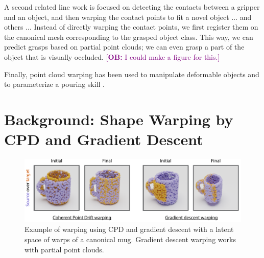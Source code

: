 \documentclass{article}
\newcommand{\ob}[1]{\textcolor{purple}{[\textbf{OB:} #1]}}
\begin{document}
A second related line work is focused on detecting the contacts between a gripper and an object, and then warping the contact points to fit a novel object \cite{li07datadriven,benamor12generalization,hillenbrand12transferring,jakel12learning,stouraitis15functional,rodriguez18learning,pavlichenko19autonomous,tian19transferring} ... and others ... Instead of directly warping the contact points, we first register them on the canonical mesh corresponding to the grasped object class. This way, we can predict grasps based on partial point clouds; we can even grasp a part of the object that is visually occluded. \ob{I could make a figure for this.}

Finally, point cloud warping has been used to manipulate deformable objects \cite{lee15learning,schulman16learning} and to parameterize a pouring skill \cite{brandi14generalizing}.



\section{Background: Shape Warping by CPD and Gradient Descent}
\label{sec:background}

\begin{figure}
    \centering
    \includegraphics[width=\textwidth]{figures/warping.pdf}
    \caption{Example of warping using CPD and gradient descent with a latent space of warps of a canonical mug. Gradient descent warping works with partial point clouds.}
    \label{fig:warping}
\end{figure}
\end{document}
